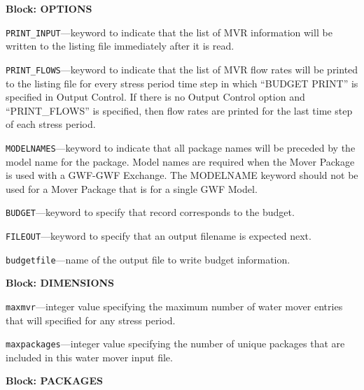 
\item \textbf{Block: OPTIONS}

\begin{description}
\item \texttt{PRINT\_INPUT}---keyword to indicate that the list of MVR information will be written to the listing file immediately after it is read.

\item \texttt{PRINT\_FLOWS}---keyword to indicate that the list of MVR flow rates will be printed to the listing file for every stress period time step in which ``BUDGET PRINT'' is specified in Output Control.  If there is no Output Control option and ``PRINT\_FLOWS'' is specified, then flow rates are printed for the last time step of each stress period.

\item \texttt{MODELNAMES}---keyword to indicate that all package names will be preceded by the model name for the package.  Model names are required when the Mover Package is used with a GWF-GWF Exchange.  The MODELNAME keyword should not be used for a Mover Package that is for a single GWF Model.

\item \texttt{BUDGET}---keyword to specify that record corresponds to the budget.

\item \texttt{FILEOUT}---keyword to specify that an output filename is expected next.

\item \texttt{budgetfile}---name of the output file to write budget information.

\end{description}
\item \textbf{Block: DIMENSIONS}

\begin{description}
\item \texttt{maxmvr}---integer value specifying the maximum number of water mover entries that will specified for any stress period.

\item \texttt{maxpackages}---integer value specifying the number of unique packages that are included in this water mover input file.

\end{description}
\item \textbf{Block: PACKAGES}

